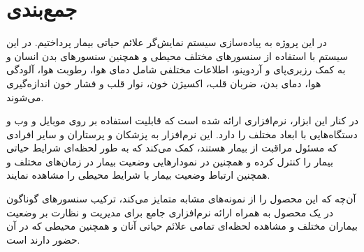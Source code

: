 \chapter{جمع‌بندی}

در این پروژه به پیاده‌سازی سیستم نمایش‌گر علائم حیاتی بیمار پرداختیم. در این سیستم با استفاده از سنسورهای مختلف محیطی و همچنین سنسور‌های بدن انسان و به کمک رزبری‌پای و آردوینو، اطلاعات مختلفی شامل دمای هوا، رطوبت هوا، آلودگی‌ هوا، دمای بدن، ضربان قلب،‌ اکسیژن خون، نوار قلب و فشار خون اندازه‌گیری می‌شوند.

در کنار این ابزار، نرم‌افزاری ارائه شده است که قابلیت استفاده بر روی موبایل و وب و دستگاه‌هایی با ابعاد مختلف را دارد. این نرم‌افزار به پزشکان و پرستاران و سایر افرادی که مسئول مراقبت از بیمار هستند، کمک می‌کند که به طور لحظه‌ای شرایط حیاتی بیمار را کنترل کرده و همچنین در نمودارهایی وضعیت بیمار در زمان‌های مختلف و همچنین ارتباط وضعیت بیمار با شرایط محیطی را مشاهده نمایند.

آن‌چه که این محصول را از نمونه‌های مشابه متمایز می‌کند، ترکیب سنسور‌های گوناگون در یک محصول به همراه ارائه نرم‌افزاری جامع برای مدیریت و نظارت بر وضعیت بیماران مختلف و مشاهده لحظه‌ای تمامی علائم حیاتی آنان و همچنین محیطی که در آن حضور دارند است.


